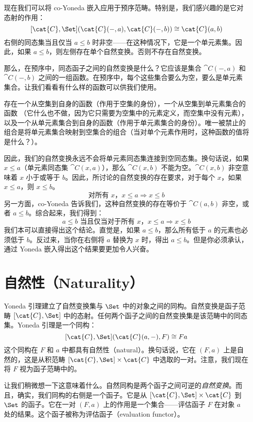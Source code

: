 现在我们可以将 co-Yoneda 嵌入应用于预序范畴。特别是，我们感兴趣的是它对态射的作用：
\[[\cat{C}, \Set](\cat{C}(-, a), \cat{C}(-, b)) \cong \cat{C}(a, b)\]
右侧的同态集当且仅当 $a \leqslant b$ 时非空——在这种情况下，它是一个单元素集。因此，如果 $a \leqslant b$，则左侧存在单个自然变换。否则不存在自然变换。

那么，在预序中，同态函子之间的自然变换是什么？它应该是集合 $\cat{C}(-, a)$ 和 $\cat{C}(-, b)$ 之间的一组函数。在预序中，每个这些集合要么为空，要么是单元素集合。让我们看看有什么样的函数可以供我们使用。

存在一个从空集到自身的函数（作用于空集的身份），一个从空集到单元素集合的函数 （它什么也不做，因为它只需要为空集中的元素定义，而空集中没有元素），以及一个从单元素集合到自身的函数（作用于单元素集合的身份）。唯一被禁止的组合是将单元素集合映射到空集合的组合（当对单个元素作用时，这种函数的值将是什么？）。

因此，我们的自然变换永远不会将单元素同态集连接到空同态集。换句话说，如果 $x \leqslant a$（单元素同态集 $\cat{C}(x, a)$），那么 $\cat{C}(x, b)$ 不能为空。$\cat{C}(x, b)$ 非空意味着 $x$ 小于或等于 $b$。因此，所讨论的自然变换的存在要求，对于每个 $x$，如果 $x \leqslant a$，则 $x \leqslant b$。
\[\text{对所有 } x，x \leqslant a \Rightarrow x \leqslant b\]
另一方面，co-Yoneda 告诉我们，这种自然变换的存在等价于 $\cat{C}(a, b)$ 非空，或者 $a \leqslant b$。综合起来，我们得到：
\[a \leqslant b \text{ 当且仅当对于所有 } x，x \leqslant a \Rightarrow x \leqslant b\]
我们本可以直接得出这个结论。直觉是，如果 $a \leqslant b$，那么所有低于 $a$ 的元素也必须低于 $b$。反过来，当你在右侧将 $a$ 替换为 $x$ 时，得出 $a \leqslant b$。但是你必须承认，通过 Yoneda 嵌入得出这个结果要更加令人兴奋。

\section{自然性（Naturality）}

Yoneda 引理建立了自然变换集与 $\Set$ 中的对象之间的同构。自然变换是函子范畴 $[\cat{C}, \Set]$ 中的态射。任何两个函子之间的自然变换集是该范畴中的同态集。Yoneda 引理是一个同构：
\[[\cat{C}, \Set](\cat{C}(a, -), F) \cong F a\]
这个同构在 $F$ 和 $a$ 中都具有自然性（natural）。换句话说，它在 $(F, a)$ 上是自然的，这是从积范畴 $[\cat{C}, \Set] \times \cat{C}$ 中选取的一对。注意，我们现在将 $F$ 视为函子范畴中的。

让我们稍微想一下这意味着什么。自然同构是两个函子之间可逆的\emph{自然变换}。而且，确实，我们同构的右侧是一个函子。它是从 $[\cat{C}, \Set] \times \cat{C}$ 到 $\Set$ 的函子。它在一对 $(F, a)$ 上的作用是一个集合——评估函子 $F$ 在对象 $a$ 处的结果。这个函子被称为评估函子（evaluation functor）。

